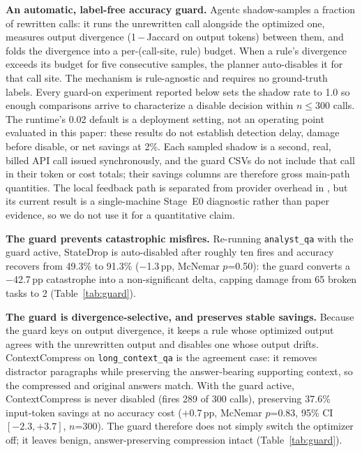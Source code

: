 \textbf{An automatic, label-free accuracy guard.} Agentc shadow-samples a fraction of
rewritten calls: it runs the unrewritten call alongside the optimized one, measures
output divergence (1\,$-$\,Jaccard on output tokens) between them, and folds the
divergence into a per-(call-site, rule) budget. When a rule's divergence exceeds its
budget for five consecutive samples, the planner auto-disables it for that call site.
The mechanism is rule-agnostic and requires no ground-truth labels. Every guard-on
experiment reported below sets the shadow rate to 1.0 so enough comparisons arrive to
characterize a disable decision within $n\leq300$ calls. The runtime's 0.02 default is
a deployment setting, not an operating point evaluated in this paper: these results do
not establish detection delay, damage before disable, or net savings at 2\%. Each sampled
shadow is a second, real, billed API call issued synchronously, and the guard CSVs do not
include that call in their token or cost totals; their savings columns are therefore gross
main-path quantities. The local feedback path is separated from provider overhead in
, but its current result is a single-machine Stage~E0
diagnostic rather than paper evidence, so we do not use it for a quantitative claim.

\textbf{The guard prevents catastrophic misfires.} Re-running \texttt{analyst\_qa} with
the guard active, StateDrop is auto-disabled after roughly ten fires and accuracy
recovers from 49.3\% to 91.3\% ($-$1.3\,pp, McNemar $p$=0.50): the guard converts a
$-$42.7\,pp catastrophe into a non-significant delta, capping damage from 65 broken
tasks to 2 (Table~\ref{tab:guard}).

\textbf{The guard is divergence-selective, and preserves stable savings.} Because the
guard keys on output divergence, it keeps a rule whose optimized output agrees with the
unrewritten output and disables one whose output drifts. ContextCompress on
\texttt{long\_context\_qa} is the agreement case: it removes distractor paragraphs while
preserving the answer-bearing supporting context, so the compressed and original answers
match. With the guard active, ContextCompress is never disabled (fires 289 of 300 calls),
preserving 37.6\% input-token savings at no accuracy cost ($+$0.7\,pp, McNemar $p$=0.83,
95\% CI $[-2.3,+3.7]$, $n$=300). The guard therefore does not simply switch the optimizer
off; it leaves benign, answer-preserving compression intact (Table~\ref{tab:guard}).

